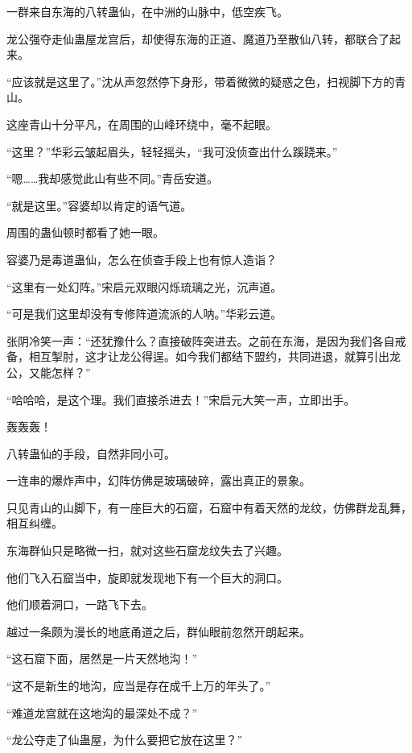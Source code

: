 
\begin{this_body}

一群来自东海的八转蛊仙，在中洲的山脉中，低空疾飞。

龙公强夺走仙蛊屋龙宫后，却使得东海的正道、魔道乃至散仙八转，都联合了起来。

“应该就是这里了。”沈从声忽然停下身形，带着微微的疑惑之色，扫视脚下方的青山。

这座青山十分平凡，在周围的山峰环绕中，毫不起眼。

“这里？”华彩云皱起眉头，轻轻摇头，“我可没侦查出什么蹊跷来。”

“嗯……我却感觉此山有些不同。”青岳安道。

“就是这里。”容婆却以肯定的语气道。

周围的蛊仙顿时都看了她一眼。

容婆乃是毒道蛊仙，怎么在侦查手段上也有惊人造诣？

“这里有一处幻阵。”宋启元双眼闪烁琉璃之光，沉声道。

“可是我们这里却没有专修阵道流派的人呐。”华彩云道。

张阴冷笑一声：“还犹豫什么？直接破阵突进去。之前在东海，是因为我们各自戒备，相互掣肘，这才让龙公得逞。如今我们都结下盟约，共同进退，就算引出龙公，又能怎样？”

“哈哈哈，是这个理。我们直接杀进去！”宋启元大笑一声，立即出手。

轰轰轰！

八转蛊仙的手段，自然非同小可。

一连串的爆炸声中，幻阵仿佛是玻璃破碎，露出真正的景象。

只见青山的山脚下，有一座巨大的石窟，石窟中有着天然的龙纹，仿佛群龙乱舞，相互纠缠。

东海群仙只是略微一扫，就对这些石窟龙纹失去了兴趣。

他们飞入石窟当中，旋即就发现地下有一个巨大的洞口。

他们顺着洞口，一路飞下去。

越过一条颇为漫长的地底甬道之后，群仙眼前忽然开朗起来。

“这石窟下面，居然是一片天然地沟！”

“这不是新生的地沟，应当是存在成千上万的年头了。”

“难道龙宫就在这地沟的最深处不成？”

“龙公夺走了仙蛊屋，为什么要把它放在这里？”


\end{this_body}
